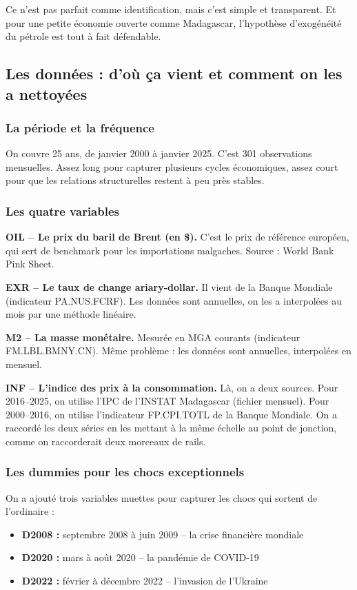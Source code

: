 \documentclass[12pt,a4paper]{article}
\begin{document}
Ce n'est pas parfait comme identification, mais c'est simple et transparent. Et pour une petite économie ouverte comme Madagascar, l'hypothèse d'exogénéité du pétrole est tout à fait défendable.

\subsection{Les données : d'où ça vient et comment on les a nettoyées}

\subsubsection{La période et la fréquence}

On couvre 25 ans, de janvier 2000 à janvier 2025. C'est 301 observations mensuelles. Assez long pour capturer plusieurs cycles économiques, assez court pour que les relations structurelles restent à peu près stables.

\subsubsection{Les quatre variables}

\textbf{OIL -- Le prix du baril de Brent (en \$).} C'est le prix de référence européen, qui sert de benchmark pour les importations malgaches. Source : World Bank Pink Sheet.

\textbf{EXR -- Le taux de change ariary-dollar.} Il vient de la Banque Mondiale (indicateur PA.NUS.FCRF). Les données sont annuelles, on les a interpolées au mois par une méthode linéaire.

\textbf{M2 -- La masse monétaire.} Mesurée en MGA courants (indicateur FM.LBL.BMNY.CN). Même problème : les données sont annuelles, interpolées en mensuel.

\textbf{INF -- L'indice des prix à la consommation.} Là, on a deux sources. Pour 2016--2025, on utilise l'IPC de l'INSTAT Madagascar (fichier mensuel). Pour 2000--2016, on utilise l'indicateur FP.CPI.TOTL de la Banque Mondiale. On a raccordé les deux séries en les mettant à la même échelle au point de jonction, comme on raccorderait deux morceaux de rails.

\subsubsection{Les dummies pour les chocs exceptionnels}

On a ajouté trois variables muettes pour capturer les chocs qui sortent de l'ordinaire :
\begin{itemize}
  \item \textbf{D2008 :} septembre 2008 à juin 2009 -- la crise financière mondiale
  \item \textbf{D2020 :} mars à août 2020 -- la pandémie de COVID-19
  \item \textbf{D2022 :} février à décembre 2022 -- l'invasion de l'Ukraine
\end{itemize}
\end{document}
